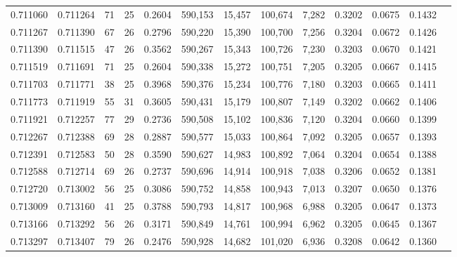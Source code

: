 \begin{tabular}{rrrrrrrrrrrrr}
0.711060 & 0.711264 &  71 &  25 &                                     0.2604 & 590,153 &  15,457 & 100,674 &   7,282 & 0.3202 & 0.0675 & 0.1432 \\
0.711267 & 0.711390 &  67 &  26 &                                     0.2796 & 590,220 &  15,390 & 100,700 &   7,256 & 0.3204 & 0.0672 & 0.1426 \\
0.711390 & 0.711515 &  47 &  26 &                                     0.3562 & 590,267 &  15,343 & 100,726 &   7,230 & 0.3203 & 0.0670 & 0.1421 \\
0.711519 & 0.711691 &  71 &  25 &                                     0.2604 & 590,338 &  15,272 & 100,751 &   7,205 & 0.3205 & 0.0667 & 0.1415 \\
0.711703 & 0.711771 &  38 &  25 &                                     0.3968 & 590,376 &  15,234 & 100,776 &   7,180 & 0.3203 & 0.0665 & 0.1411 \\
0.711773 & 0.711919 &  55 &  31 &                                     0.3605 & 590,431 &  15,179 & 100,807 &   7,149 & 0.3202 & 0.0662 & 0.1406 \\
0.711921 & 0.712257 &  77 &  29 &                                     0.2736 & 590,508 &  15,102 & 100,836 &   7,120 & 0.3204 & 0.0660 & 0.1399 \\
0.712267 & 0.712388 &  69 &  28 &                                     0.2887 & 590,577 &  15,033 & 100,864 &   7,092 & 0.3205 & 0.0657 & 0.1393 \\
0.712391 & 0.712583 &  50 &  28 &                                     0.3590 & 590,627 &  14,983 & 100,892 &   7,064 & 0.3204 & 0.0654 & 0.1388 \\
0.712588 & 0.712714 &  69 &  26 &                                     0.2737 & 590,696 &  14,914 & 100,918 &   7,038 & 0.3206 & 0.0652 & 0.1381 \\
0.712720 & 0.713002 &  56 &  25 &                                     0.3086 & 590,752 &  14,858 & 100,943 &   7,013 & 0.3207 & 0.0650 & 0.1376 \\
0.713009 & 0.713160 &  41 &  25 &                                     0.3788 & 590,793 &  14,817 & 100,968 &   6,988 & 0.3205 & 0.0647 & 0.1373 \\
0.713166 & 0.713292 &  56 &  26 &                                     0.3171 & 590,849 &  14,761 & 100,994 &   6,962 & 0.3205 & 0.0645 & 0.1367 \\
0.713297 & 0.713407 &  79 &  26 &                                     0.2476 & 590,928 &  14,682 & 101,020 &   6,936 & 0.3208 & 0.0642 & 0.1360 \\

\end{tabular}
